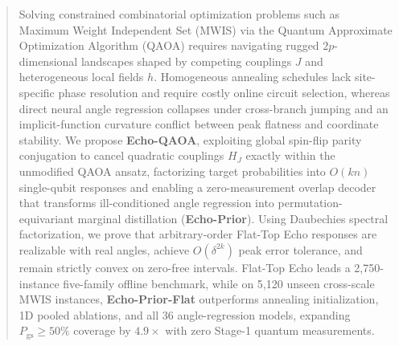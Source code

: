 \documentclass{article}
\theoremstyle{plain}
\theoremstyle{definition}
\begin{document}

\printAffiliationsAndNotice{}


\begin{abstract}

Solving constrained combinatorial optimization problems such as Maximum Weight Independent Set (MWIS) via the Quantum Approximate Optimization Algorithm (QAOA) requires navigating rugged $2p$-dimensional landscapes shaped by competing couplings $J$ and heterogeneous local fields $h$. Homogeneous annealing schedules lack site-specific phase resolution and require costly online circuit selection, whereas direct neural angle regression collapses under cross-branch jumping and an implicit-function curvature conflict between peak flatness and coordinate stability. We propose \textbf{Echo-QAOA}, exploiting global spin-flip parity conjugation to cancel quadratic couplings $H_J$ exactly within the unmodified QAOA ansatz, factorizing target probabilities into $O(kn)$ single-qubit responses and enabling a zero-measurement overlap decoder that transforms ill-conditioned angle regression into permutation-equivariant marginal distillation (\textbf{Echo-Prior}). Using Daubechies spectral factorization, we prove that arbitrary-order Flat-Top Echo responses are realizable with real angles, achieve $O(\delta^{2k})$ peak error tolerance, and remain strictly convex on zero-free intervals. Flat-Top Echo leads a 2,750-instance five-family offline benchmark, while on 5,120 unseen cross-scale MWIS instances, \textbf{Echo-Prior-Flat} outperforms annealing initialization, 1D pooled ablations, and all 36 angle-regression models, expanding $P_{\mathrm{gs}}\ge 50\%$ coverage by $4.9\times$ with zero Stage-1 quantum measurements.

\end{abstract}
\end{document}
